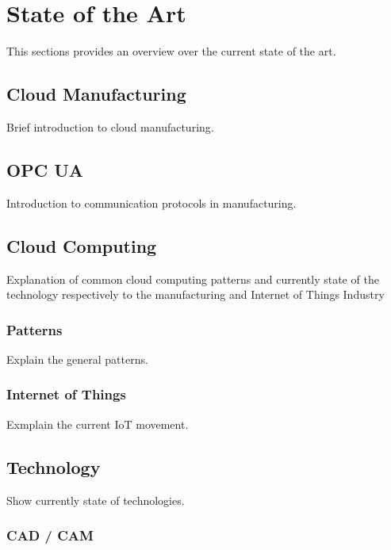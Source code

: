 \documentclass[
a4paper,
twoside,
bibliography=totoc,
headsepline,
cleardoublepage=empty,
parskip=half,
draft=false
]{scrbook}
\begin{document}
	\chapter{State of the Art} \label{ch:state_of_the_art}
	
		This sections provides an overview over the current state of the art.
		
		\section{Cloud Manufacturing} \label{sec:cloud_manufacturing}
		
			Brief introduction to cloud manufacturing.
			
		\section{OPC UA} \label{sec:opc_ua}
		
			Introduction to communication protocols in manufacturing.
			
		\section{Cloud Computing} \label{sec:cloud_computing}
		
			Explanation of common cloud computing patterns and currently state of the technology respectively to the manufacturing and Internet of Things Industry
			
			\subsection{Patterns} \label{subsec:patterns}
			
				Explain the general patterns.
				
			\subsection{Internet of Things} \label{subsec:internet_of_things}
			
				Exmplain the current IoT movement.
				
		\section{Technology} \label{sec:technology}
		
			Show currently state of technologies.
			
				\subsection{CAD / CAM} \label{subsec:cad_cam}
				
\end{document}
